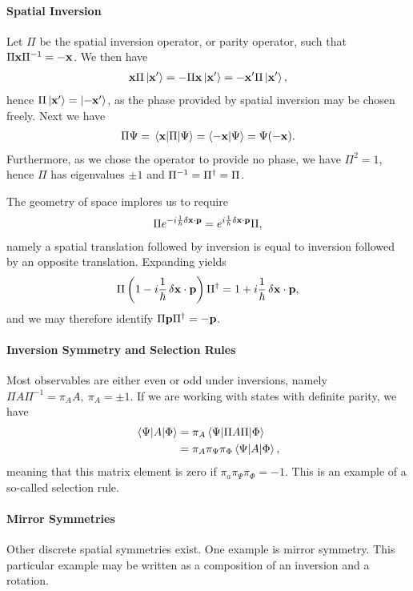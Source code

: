 \paragraph{Spatial Inversion}
Let $\Pi$ be the spatial inversion operator, or parity operator, such that $\Pi\vb{x}\Pi^{-1} = -\vb{x}$. We then have
\begin{align*}
	\vb{x}\Pi\ket{\vb{x}^{\prime}} = -\Pi\vb{x}\ket{\vb{x}^{\prime}} = -\vb{x}^{\prime}\Pi\ket{\vb{x}^{\prime}},
\end{align*}
hence $\Pi\ket{\vb{x}^{\prime}} = \ket{-\vb{x}^{\prime}}$, as the phase provided by spatial inversion may be chosen freely. Next we have
\begin{align*}
	\Pi\Psi = \mel{\vb{x}}{\Pi}{\Psi} = \braket{-\vb{x}}{\Psi} = \Psi(-\vb{x}).
\end{align*}
Furthermore, as we chose the operator to provide no phase, we have $\Pi^{2} = 1$, hence $\Pi$ has eigenvalues $\pm 1$ and $\Pi^{-1} = \Pi^{\dagger} = \Pi$.

The geometry of space implores us to require
\begin{align*}
	\Pi e^{-i\frac{1}{\hbar}\var{\vb{x}}\cdot\vb{p}} = e^{i\frac{1}{\hbar}\var{\vb{x}}\cdot\vb{p}}\Pi,
\end{align*}
namely a spatial translation followed by inversion is equal to inversion followed by an opposite translation. Expanding yields
\begin{align*}
	\Pi\left(1 -i\frac{1}{\hbar}\var{\vb{x}}\cdot\vb{p}\right)\Pi^{\dagger} = 1 + i\frac{1}{\hbar}\var{\vb{x}}\cdot\vb{p},
\end{align*}
and we may therefore identify $\Pi\vb{p}\Pi^{\dagger} = -\vb{p}$.

\paragraph{Inversion Symmetry and Selection Rules}
Most observables are either even or odd under inversions, namely $\Pi A\Pi^{-1} = \pi_{A}A,\ \pi_{A} = \pm 1$. If we are working with states with definite parity, we have
\begin{align*}
	\mel{\Psi}{A}{\Phi} &= \pi_{A}\mel{\Psi}{\Pi A\Pi}{\Phi} \\
	                    &= \pi_{A}\pi_{\Psi}\pi_{\Phi}\mel{\Psi}{A}{\Phi},
\end{align*}
meaning that this matrix element is zero if $\pi_{a}\pi_{\Psi}\pi_{\Phi} = -1$. This is an example of a so-called selection rule.

\paragraph{Mirror Symmetries}
Other discrete spatial symmetries exist. One example is mirror symmetry. This particular example may be written as a composition of an inversion and a rotation.

